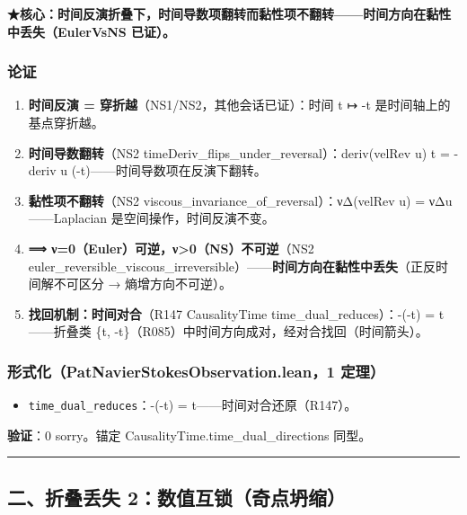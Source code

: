 \documentclass[
]{article}
\providecommand{\tightlist}{%
  \setlength{\itemsep}{0pt}\setlength{\parskip}{0pt}}
\begin{document}
\textbf{★核心：时间反演折叠下，时间导数项翻转而黏性项不翻转------时间方向在黏性中丢失（EulerVsNS
已证）。}

\subsubsection{论证}\label{ux8bbaux8bc1}

\begin{enumerate}
\def\labelenumi{\arabic{enumi}.}
\tightlist
\item
  \textbf{时间反演 = 穿折越}（NS1/NS2，其他会话已证）：时间 t ↦ -t
  是时间轴上的基点穿折越。
\item
  \textbf{时间导数翻转}（NS2
  timeDeriv\_flips\_under\_reversal）：deriv(velRev u) t = -deriv u
  (-t)------时间导数项在反演下翻转。
\item
  \textbf{黏性项不翻转}（NS2
  viscous\_invariance\_of\_reversal）：νΔ(velRev u) = νΔu------Laplacian
  是空间操作，时间反演不变。
\item
  \textbf{⟹ ν=0（Euler）可逆，ν\textgreater0（NS）不可逆}（NS2
  euler\_reversible\_viscous\_irreversible）------\textbf{时间方向在黏性中丢失}（正反时间解不可区分
  → 熵增方向不可逆）。
\item
  \textbf{找回机制：时间对合}（R147 CausalityTime
  time\_dual\_reduces）：-(-t) = t------折叠类 \{t,
  -t\}（R085）中时间方向成对，经对合找回（时间箭头）。
\end{enumerate}

\subsubsection{形式化（PatNavierStokesObservation.lean，1
定理）}\label{ux5f62ux5f0fux5316patnavierstokesobservation.lean1-ux5b9aux7406}

\begin{itemize}
\tightlist
\item
  \texttt{time\_dual\_reduces}：-(-t) = t------时间对合还原（R147）。
\end{itemize}

\textbf{验证}：0 sorry。锚定 CausalityTime.time\_dual\_directions 同型。

\begin{center}\rule{0.5\linewidth}{0.5pt}\end{center}

\subsection{二、折叠丢失
2：数值互锁（奇点坍缩）}\label{ux4e8cux6298ux53e0ux4e22ux5931-2ux6570ux503cux4e92ux9501ux5947ux70b9ux574dux7f29}
\end{document}
